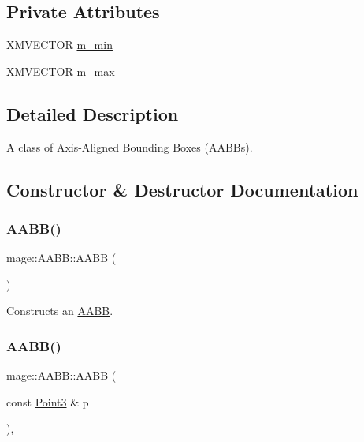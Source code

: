\subsection*{Private Attributes}
\begin{DoxyCompactItemize}
\item 
X\+M\+V\+E\+C\+T\+OR \hyperlink{classmage_1_1_a_a_b_b_a9aa94271f73b8199a0431b0ae2abb35a}{m\+\_\+min}
\item 
X\+M\+V\+E\+C\+T\+OR \hyperlink{classmage_1_1_a_a_b_b_a9f850f5f39e4b2192dfac97c508ef052}{m\+\_\+max}
\end{DoxyCompactItemize}


\subsection{Detailed Description}
A class of Axis-\/\+Aligned Bounding Boxes (A\+A\+B\+Bs). 

\subsection{Constructor \& Destructor Documentation}
\hypertarget{classmage_1_1_a_a_b_b_a4bf8c44135580cda2ab0c78da14c634e}{}\label{classmage_1_1_a_a_b_b_a4bf8c44135580cda2ab0c78da14c634e} 
\subsubsection{\texorpdfstring{A\+A\+B\+B()}{AABB()}\hspace{0.1cm}{\footnotesize\ttfamily [1/8]}}
{\footnotesize\ttfamily mage\+::\+A\+A\+B\+B\+::\+A\+A\+BB (\begin{DoxyParamCaption}{ }\end{DoxyParamCaption})\hspace{0.3cm}{\ttfamily [noexcept]}}

Constructs an \hyperlink{classmage_1_1_a_a_b_b}{A\+A\+BB}. \hypertarget{classmage_1_1_a_a_b_b_a97a4a755cb0b9c017fd5a311576a5c00}{}\label{classmage_1_1_a_a_b_b_a97a4a755cb0b9c017fd5a311576a5c00} 
\subsubsection{\texorpdfstring{A\+A\+B\+B()}{AABB()}\hspace{0.1cm}{\footnotesize\ttfamily [2/8]}}
{\footnotesize\ttfamily mage\+::\+A\+A\+B\+B\+::\+A\+A\+BB (\begin{DoxyParamCaption}\item[{const \hyperlink{structmage_1_1_point3}{Point3} \&}]{p }\end{DoxyParamCaption})\hspace{0.3cm}{\ttfamily [explicit]}, {\ttfamily [noexcept]}}

